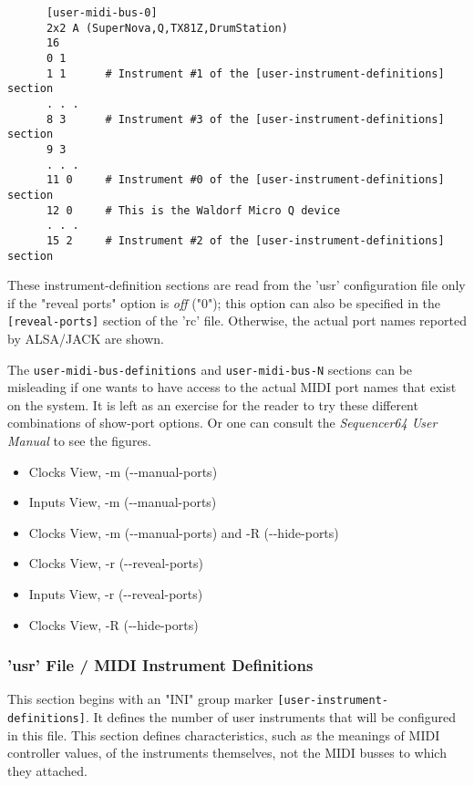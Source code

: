    \begin{verbatim}
      [user-midi-bus-0]
      2x2 A (SuperNova,Q,TX81Z,DrumStation)
      16
      0 1
      1 1      # Instrument #1 of the [user-instrument-definitions] section
      . . .
      8 3      # Instrument #3 of the [user-instrument-definitions] section
      9 3
      . . .
      11 0     # Instrument #0 of the [user-instrument-definitions] section
      12 0     # This is the Waldorf Micro Q device
      . . .
      15 2     # Instrument #2 of the [user-instrument-definitions] section
   \end{verbatim}

   These instrument-definition
   sections are read from the 'usr' configuration file only if
   the "reveal ports" option is \textsl{off} ("0");
   this option can also be specified in the
   \texttt{[reveal-ports]} section of the 'rc' file.
   Otherwise, the actual port names reported by ALSA/JACK are shown.

   The \texttt{user-midi-bus-definitions} and \texttt{user-midi-bus-N} sections
   can be misleading if one wants to have access to the
   actual MIDI port names that exist on the system.
   It is left as an exercise for the reader to try these different combinations
   of show-port options.  Or one can consult the \textsl{Sequencer64 User
   Manual} to see the figures.

   \begin{itemize}
      \item Clocks View, -m (-{}-manual-ports)
      \item Inputs View, -m (-{}-manual-ports)
      \item Clocks View, -m (-{}-manual-ports) and -R (-{}-hide-ports)
      \item Clocks View, -r (-{}-reveal-ports)
      \item Inputs View, -r (-{}-reveal-ports)
      \item Clocks View, -R (-{}-hide-ports)
   \end{itemize}

\subsubsection{'usr' File / MIDI Instrument Definitions}
\label{subsubsec:usr_file_midi_instrument_definitions}

   This section begins with an
   "INI" group marker \texttt{[user-instrument-definitions]}.
   It defines the number of user instruments that will be configured in this
   file.  This section defines characteristics, such as
   the meanings of MIDI controller values, of the instruments themselves,
   not the MIDI busses to which they attached.

